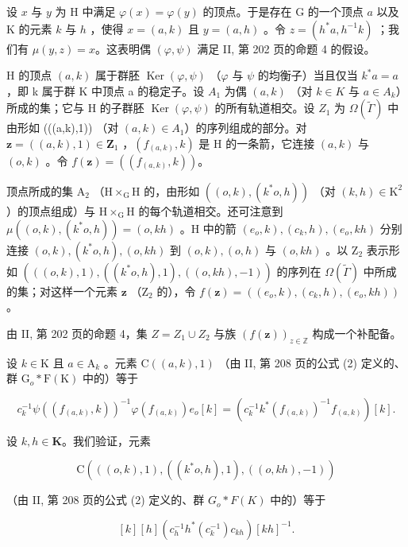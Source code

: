 设 \(x\) 与 \(y\) 为 H 中满足 \(\varphi(x) = \varphi(y)\) 的顶点。于是存在 G 的一个顶点 \(a\) 以及 K 的元素 \(k\) 与 \(h\) ，使得 \(x = (a, k)\) 且 \(y = (a, h)\) 。令 \(z = (h^* a, h^{-1} k)\) ；我们有 \(\mu(y, z) = x\)。这表明偶 \((\varphi, \psi)\) 满足 II, 第 202 页的命题 4 的假设。

H 的顶点 \((a,k)\) 属于群胚 \(\operatorname{Ker}(\varphi,\psi)\) （\(\varphi\) 与 \(\psi\) 的均衡子）当且仅当 \(k^{*}a=a\) ，即 k 属于群 K 中顶点 a 的稳定子。设 \(A_{1}\) 为偶 \((a,k)\) （对 \(k\in K\) 与 \(a\in A_{k}\)）所成的集；它与 H 的子群胚 \(\operatorname{Ker}(\varphi,\psi)\) 的所有轨道相交。设 \(Z_{1}\) 为 \(\Omega(\widetilde{\Gamma})\) 中由形如 (((a,k),1)) （对 \((a,k)\in A_{1}\)）的序列组成的部分。对 \(\mathbf{z}=((a,k),1)\in\mathbf{Z}_{1}\) ，\((f_{(a,k)},k)\) 是 H 的一条箭，它连接 \((a,k)\) 与 \((o,k)\) 。令 \(f(\mathbf{z})=((f_{(a,k)},k))\)。

顶点所成的集 \(\mathrm{A}_2\) （\(\mathrm{H} \times_{\mathrm{G}} \mathrm{H}\) 的，由形如 \(((o,k), (k^*o,h))\) （对 \((k,h) \in \mathrm{K}^2\) ）的顶点组成）与 \(\mathrm{H} \times_{\mathrm{G}} \mathrm{H}\) 的每个轨道相交。还可注意到 \(\mu((o,k), (k^*o,h)) = (o,kh)\) 。H 中的箭 \((e_o,k), (c_k,h), (e_o,kh)\) 分别连接 \((o,k), (k^*o,h), (o,kh)\) 到 \((o,k), (o,h)\) 与 \((o,kh)\) 。以 \(\mathrm{Z}_2\) 表示形如 \((((o,k),1), ((k^*o,h), 1), ((o,kh), -1))\) 的序列在 \(\Omega(\widetilde{\Gamma})\) 中所成的集；对这样一个元素 \(\mathbf{z}\) （\(\mathrm{Z}_2\) 的），令 \(f(\mathbf{z}) = ((e_o,k), (c_k,h), (e_o,kh))\) 。

由 II, 第 202 页的命题 4，集 \(Z = Z_1 \cup Z_2\) 与族 \((f(\mathbf{z}))_{z \in \mathbb{Z}}\) 构成一个补配备。

设 \(k \in \mathrm{K}\) 且 \(a \in \mathrm{A}_k\) 。元素 \(\mathrm{C}((a, k), 1)\) （由 II, 第 208 页的公式 (2) 定义的、群 \(\mathrm{G}_o * \mathrm{F}(\mathrm{K})\) 中的）等于

\[
c _ {k} ^ {- 1} \psi ((f _ {(a, k)}, k)) ^ {- 1} \varphi (f _ {(a, k)}) e _ {o} [ k ] = (c _ {k} ^ {- 1} k ^ {*} (f _ {(a, k)}) ^ {- 1} f _ {(a, k)}) [ k ].\tag{4}
\]

设 \(k,h \in \mathbf{K}\)。我们验证，元素

\[
\mathrm{C} (((o, k), 1), ((k ^ {*} o, h), 1), ((o, k h), - 1))
\]

（由 II, 第 208 页的公式 (2) 定义的、群 \(G_{o} * F(K)\) 中的）等于

\[
[ k ] [ h ] (c _ {h} ^ {- 1} h ^ {*} (c _ {k} ^ {- 1}) c _ {k h}) [ k h ] ^ {- 1}.\tag{5}
\]

